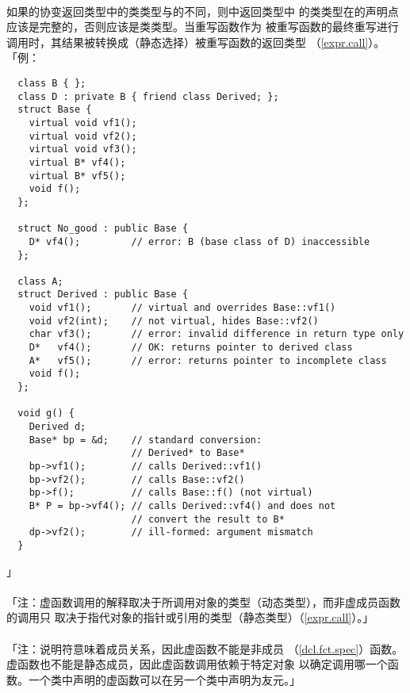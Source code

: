 \paragraph{}
如果的协变返回类型中的类类型与的不同，则中返回类型中
的类类型在的声明点应该是完整的，否则应该是类类型。当重写函数作为
被重写函数的最终重写进行调用时，其结果被转换成（静态选择）被重写函数的返回类型
（\ref{expr.call}）。「例：
\begin{lstlisting}
  class B { };
  class D : private B { friend class Derived; };
  struct Base {
    virtual void vf1();
    virtual void vf2();
    virtual void vf3();
    virtual B* vf4();
    virtual B* vf5();
    void f();
  };

  struct No_good : public Base {
    D* vf4();         // error: B (base class of D) inaccessible
  };

  class A;
  struct Derived : public Base {
    void vf1();       // virtual and overrides Base::vf1()
    void vf2(int);    // not virtual, hides Base::vf2()
    char vf3();       // error: invalid difference in return type only
    D*   vf4();       // OK: returns pointer to derived class
    A*   vf5();       // error: returns pointer to incomplete class
    void f();
  };

  void g() {
    Derived d;
    Base* bp = &d;    // standard conversion:
                      // Derived* to Base*
    bp->vf1();        // calls Derived::vf1()
    bp->vf2();        // calls Base::vf2()
    bp->f();          // calls Base::f() (not virtual)
    B* P = bp->vf4(); // calls Derived::vf4() and does not
                      // convert the result to B*
    dp->vf2();        // ill-formed: argument mismatch
  }
\end{lstlisting}」

\paragraph{}
「注：虚函数调用的解释取决于所调用对象的类型（动态类型），而非虚成员函数的调用只
取决于指代对象的指针或引用的类型（静态类型）（\ref{expr.call}）。」

\paragraph{}
「注：说明符意味着成员关系，因此虚函数不能是非成员
（\ref{dcl.fct.spec}）函数。虚函数也不能是静态成员，因此虚函数调用依赖于特定对象
以确定调用哪一个函数。一个类中声明的虚函数可以在另一个类中声明为友元。」

